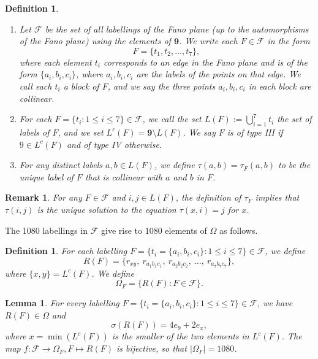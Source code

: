 \documentclass[10pt,a4paper]{amsart}
\newtheorem{lemma}[theorem]{Lemma}
\newtheorem{defn}[theorem]{Definition}
\newtheorem{rmk}[theorem]{Remark}
\numberwithin{equation}{section}
\newcommand{\ra}{\rightarrow}
\newcommand{\lc}{L^c}
\newcommand{\calf}{\mathcal{F}}
\newcommand{\rr}{r}
\newcommand{\nine}{\mathbf{9}}
\newcommand{\ob}{\Omega}
\newcommand{\fob}{\Omega_F}
\newcommand{\abs}[1]{\lvert #1 \rvert}
\begin{document}
\begin{defn}\label{def:fdef}
\begin{enumerate}
  \item Let $\calf$ be the set of all labellings of the Fano plane (up to the
  automorphisms of the Fano plane) using the elements of
  $\nine$. We write each $F\in \calf$ in the form 
  \[
  F = \{t_1, t_2, \dots, t_7\}, 
  \]
  where each element $t_i$ corresponds to an edge in the Fano plane and is of
  the form $\{a_i,b_i,c_i\}$, where $a_i, b_i, c_i$ are the labels of the points
  on that edge. We  call each $t_i$ a {\it block} of $F$, and we say the three
  points $a_i, b_i, c_i$ in each block are \emph{collinear}. 

\item For each $F=\{t_i:1\le i\le 7\}\in \calf$, we call the set 
$L(F) := \bigcup_{i=1}^7 t_i$ the set of {\it labels} of $F$, and we set
$\lc(F)=\nine\setminus L(F)$.
We say $F$ is of \emph{type III} if $9\in \lc(F)$ and
  of \emph{type IV} otherwise.

\item  For any distinct labels $a,b\in L(F)$, we define $\tau(a,b)=\tau_F(a,b)$ to be the unique
  label of $F$ that is collinear with $a$ and $b$ in $F$.    
\end{enumerate}
\end{defn}

\begin{rmk}
\label{rmk:sol}
For any $F\in \calf$ and $i,j\in L(F)$, the definition of $\tau_F$ implies that $\tau(i,j)$ is the unique solution to the equation $\tau(x,i)=j$ for $x$.
\end{rmk}

The 1080 labellings in $\calf$ give rise to $1080$ elements of $\ob$ as
follows.  


\begin{defn}
\label{defn:fob_construction}
For each labelling $F=\{t_i=\{a_i,b_i,c_i\}: 1\le i\le 7\}\in \calf$, we
  define 
  \[  
R(F) = \{\rr_{xy}, \ \rr_{a_1b_1c_1}, \ \rr_{a_2b_2c_2}, \ \dots, \
\rr_{a_7b_7c_7}\},
  \]
  where $\{x,y\}=\lc(F)$.
We define \[ \fob=\{R(F):F\in \calf\}. \]
\end{defn}

\begin{lemma}
\label{lemm:fob_sum}
For every labelling 
$F=\{t_i=\{a_i,b_i,c_i\}: 1\le i\le 7\}\in \calf$,
we have $R(F)\in\ob$ and
\begin{equation}
  \label{eq:fob_sum}
  \sigma(R(F)) = 4e_9 + 2e_x,
\end{equation}
where $x=\min(\lc(F))$ is the smaller of the two elements in $\lc(F)$.
The map $f: \calf\ra \fob, F\mapsto R(F)$ is bijective, so that
$\abs{\fob}=1080$.
\end{lemma}
\end{document}
